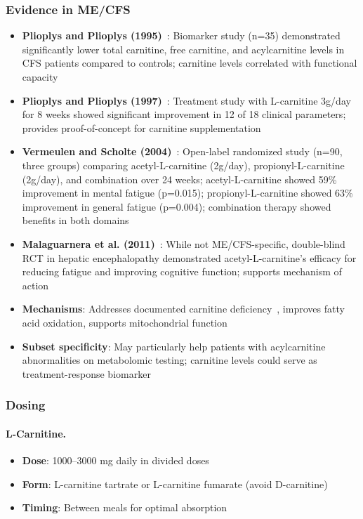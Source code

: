 \subsubsection{Evidence in ME/CFS}

\begin{itemize}
    \item \textbf{Plioplys and Plioplys (1995)}~\cite{Plioplys1995carnitine}: Biomarker study (n=35) demonstrated significantly lower total carnitine, free carnitine, and acylcarnitine levels in CFS patients compared to controls; carnitine levels correlated with functional capacity
    \item \textbf{Plioplys and Plioplys (1997)}~\cite{Plioplys1997carnitineTreatment}: Treatment study with L-carnitine 3g/day for 8 weeks showed significant improvement in 12 of 18 clinical parameters; provides proof-of-concept for carnitine supplementation
    \item \textbf{Vermeulen and Scholte (2004)}~\cite{Vermeulen2004carnitine}: Open-label randomized study (n=90, three groups) comparing acetyl-L-carnitine (2g/day), propionyl-L-carnitine (2g/day), and combination over 24 weeks; acetyl-L-carnitine showed 59\% improvement in mental fatigue (p=0.015); propionyl-L-carnitine showed 63\% improvement in general fatigue (p=0.004); combination therapy showed benefits in both domains
    \item \textbf{Malaguarnera et al. (2011)}~\cite{Malaguarnera2011ALCAR}: While not ME/CFS-specific, double-blind RCT in hepatic encephalopathy demonstrated acetyl-L-carnitine's efficacy for reducing fatigue and improving cognitive function; supports mechanism of action
    \item \textbf{Mechanisms}: Addresses documented carnitine deficiency~\cite{Plioplys1995carnitine}, improves fatty acid oxidation, supports mitochondrial function
    \item \textbf{Subset specificity}: May particularly help patients with acylcarnitine abnormalities on metabolomic testing; carnitine levels could serve as treatment-response biomarker
\end{itemize}

\subsubsection{Dosing}

\paragraph{L-Carnitine.}
\begin{itemize}
    \item \textbf{Dose}: 1000--3000 mg daily in divided doses
    \item \textbf{Form}: L-carnitine tartrate or L-carnitine fumarate (avoid D-carnitine)
    \item \textbf{Timing}: Between meals for optimal absorption
\end{itemize}

